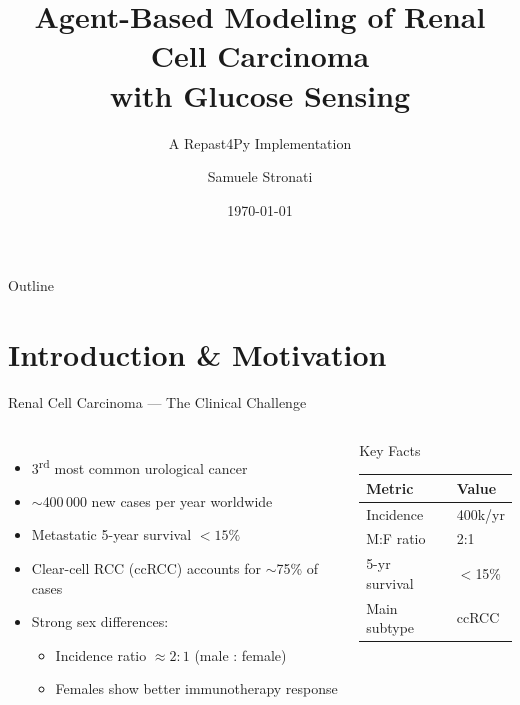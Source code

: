 \documentclass[aspectratio=169,10pt]{beamer}
\title[RCC ABM]{Agent-Based Modeling of Renal Cell Carcinoma\\with Glucose Sensing}
\subtitle{A Repast4Py Implementation}
\author{Samuele Stronati}
\date{\today}
\institute{}
\begin{document}
\begin{frame}[plain]
  \titlepage
\end{frame}

\begin{frame}{Outline}
  \tableofcontents
\end{frame}

\section{Introduction \& Motivation}

\begin{frame}{Renal Cell Carcinoma --- The Clinical Challenge}
  \begin{columns}[T]
    \begin{itemize}
      \item 3\textsuperscript{rd} most common urological cancer
      \item $\sim$400\,000 new cases per year worldwide
      \item Metastatic 5-year survival $<15\%$
      \item Clear-cell RCC (ccRCC) accounts for $\sim$75\% of cases
      \item Strong sex differences:
        \begin{itemize}
          \item Incidence ratio $\approx 2{:}1$ (male : female)
          \item Females show better immunotherapy response
        \end{itemize}
    \end{itemize}

    \begin{block}{Key Facts}
      \small
      \begin{tabular}{@{}ll@{}}
        \toprule
        Metric & Value \\
        \midrule
        Incidence & 400k/yr \\
        M:F ratio & 2:1 \\
        5-yr survival & $<$15\% \\
        Main subtype & ccRCC \\
        \bottomrule
      \end{tabular}
    \end{block}
  \end{columns}
\end{frame}
\end{document}
